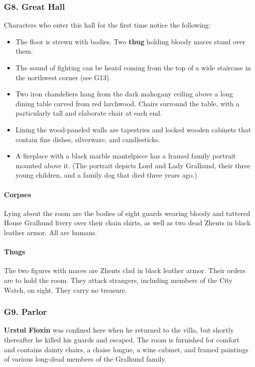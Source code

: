 \documentclass[10pt,a4paper,twoside,twocolumn,openany,nodeprecatedcode]{dndbook}
\begin{document}
\subsubsection{G8. Great Hall}
Characters who enter this hall for the first time notice the following:
\begin{itemize}

\item The floor is strewn with bodies. Two \textbf{thug} holding bloody maces stand over them.
\item The sound of fighting can be heard coming from the top of a wide staircase in the northwest corner (see G13).
\item Two iron chandeliers hang from the dark mahogany ceiling above a long dining table carved from red larchwood. Chairs surround the table, with a particularly tall and elaborate chair at each end.
\item Lining the wood-paneled walls are tapestries and locked wooden cabinets that contain fine dishes, silverware, and candlesticks.
\item A fireplace with a black marble mantelpiece has a framed family portrait mounted above it. (The portrait depicts Lord and Lady Gralhund, their three young children, and a family dog that died three years ago.)
\end{itemize}


\paragraph{Corpses}
Lying about the room are the bodies of eight guards wearing bloody and tattered House Gralhund livery over their chain shirts, as well as two dead Zhents in black leather armor. All are humans.
\paragraph{Thugs}
The two figures with maces are Zhents clad in black leather armor. Their orders are to hold the room. They attack strangers, including members of the City Watch, on sight. They carry no treasure.
\subsubsection{G9. Parlor}
\textbf{Urstul Floxin} was confined here when he returned to the villa, but shortly thereafter he killed his guards and escaped. The room is furnished for comfort and contains dainty chairs, a chaise longue, a wine cabinet, and framed paintings of various long-dead members of the Gralhund family.
\end{document}
